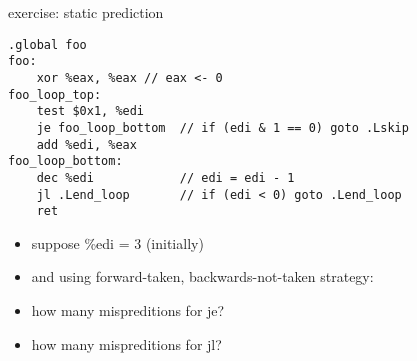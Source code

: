 \begin{frame}[fragile,label=staticPredictEx]{exercise: static prediction}
\begin{lstlisting}[language=myasm]
.global foo
foo:
    xor %eax, %eax // eax <- 0
foo_loop_top:
    test $0x1, %edi
    je foo_loop_bottom  // if (edi & 1 == 0) goto .Lskip
    add %edi, %eax 
foo_loop_bottom:
    dec %edi            // edi = edi - 1
    jl .Lend_loop       // if (edi < 0) goto .Lend_loop
    ret
\end{lstlisting}
\begin{itemize}
\item suppose \%edi = 3 (initially)
\item and using forward-taken, backwards-not-taken strategy:
\item how many mispreditions for je?
\item how many mispreditions for jl?
\end{itemize}
\end{frame}
